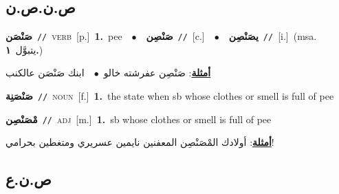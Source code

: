 \documentclass[10pt,a4paper,twoside]{article} %
\begin{document}
\begin{multicols}{2}
\vspace{-3mm}
\subsection*{\color{blue}\foreignlanguage{arabic}{ص.ن.ص.ن}\color{blue}{}} 

{\setlength\topsep{0pt}\textbf{\foreignlanguage{arabic}{صَنْصَن}}\ {\color{gray}\texttt{//}\color{black}}\ \textsc{verb}\ [p.]\ \textbf{1.}~pee\ \ $\bullet$\ \ \setlength\topsep{0pt}\textbf{\foreignlanguage{arabic}{صَنْصِن}}\ {\color{gray}\texttt{//}\color{black}}\ [c.]\ \ $\bullet$\ \ \setlength\topsep{0pt}\textbf{\foreignlanguage{arabic}{يصَنْصِن}}\ {\color{gray}\texttt{//}\color{black}}\ [i.]\ \color{gray}(msa. \foreignlanguage{arabic}{يتبوَّل}~\foreignlanguage{arabic}{\textbf{١.}})\color{black}\  \begin{flushright}\color{gray}\foreignlanguage{arabic}{\textbf{\underline{\foreignlanguage{arabic}{أمثلة}}}: صَنْصِن عفرشته خالو\ $\bullet$\ \  ابنك صَنْصَن عالكنب}\end{flushright}\color{black}} \vspace{2mm}

{\setlength\topsep{0pt}\textbf{\foreignlanguage{arabic}{صَنْصَنِة}}\ {\color{gray}\texttt{//}\color{black}}\ \textsc{noun}\ [f.]\ \textbf{1.}~the state when sb whose clothes or smell is full of pee\ } \vspace{2mm}

{\setlength\topsep{0pt}\textbf{\foreignlanguage{arabic}{مْصَنْصِن}}\ {\color{gray}\texttt{//}\color{black}}\ \textsc{adj}\ [m.]\ \textbf{1.}~sb whose clothes or smell is full of pee\  \begin{flushright}\color{gray}\foreignlanguage{arabic}{\textbf{\underline{\foreignlanguage{arabic}{أمثلة}}}: أولادك المْصَنْصِن المعفنين نايمين عسريري ومتغطين بحرامي!}\end{flushright}\color{black}} \vspace{2mm}

\vspace{-3mm}
\subsection*{\color{blue}\foreignlanguage{arabic}{ص.ن.ع}\color{blue}{}} 


\end{multicols}
\end{document}
